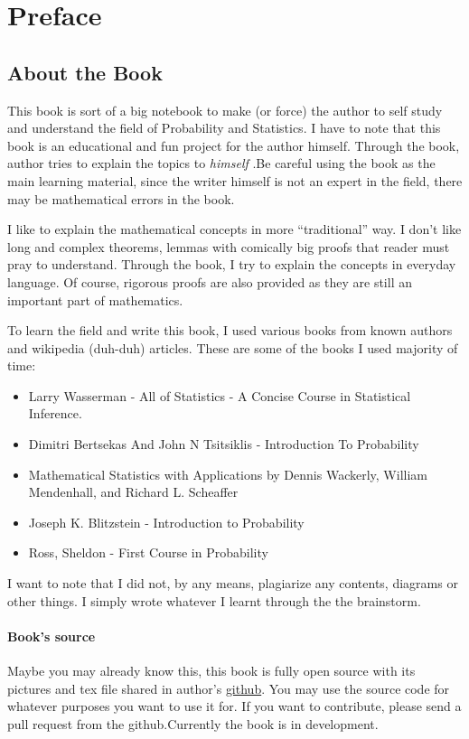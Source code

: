 \chapter*{Preface}

\section*{About the Book}
This book is sort of a big notebook to make (or force) the author to self study and understand the field of Probability and Statistics.
I have to note that this book is an educational and fun project for the author himself. Through the book, author tries to explain the topics to \textit{himself} .Be careful using the book as the main learning material, since the writer himself is not an expert in the field, there may be mathematical errors in the book.
\par

I like to explain the mathematical concepts in more ``traditional'' way. I don't like long and complex theorems, lemmas with comically big proofs that reader must pray to understand. Through the book, I try to explain the concepts in everyday language. Of course, rigorous proofs are also provided as they are still an important part of mathematics.
\par
To learn the field and write this book, I used various books from known authors and wikipedia (duh-duh) articles. These are some of the books I used majority of time:

\begin{itemize}
    \item Larry Wasserman - All of Statistics - A Concise Course in Statistical Inference.
    \item Dimitri Bertsekas And John N Tsitsiklis - Introduction To Probability
    \item Mathematical Statistics with Applications by Dennis Wackerly, William Mendenhall, and Richard L. Scheaffer
    \item Joseph K. Blitzstein - Introduction to Probability
    \item Ross, Sheldon - First Course in Probability
  \end{itemize}
I want to note that I did not, by any means, plagiarize any contents, diagrams or other things. I simply wrote whatever I learnt through the the brainstorm.
  

\subsubsection*{Book's source}
Maybe you may already know this, this book is fully open source with its pictures and tex file shared in author's \href{https://github.com/JosephMehdiyev}{github}. You may use the source code for whatever purposes you want to use it for. If you want to contribute, please send a pull request from the github.Currently the book is in development.


